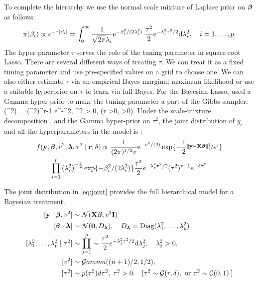 \documentclass[chapters]{uamaththesis}
\begin{document}
To complete the hierarchy we use the normal scale mixture of Laplace prior on $\boldsymbol{\beta}$  as follows:
\[
\pi(\beta_i) \propto e^{-\tau \lvert\beta_i\rvert} = \int_{0}^{\infty} \frac{1}{\sqrt{2\pi} \lambda_i} {\rm e}^{-\beta_i^2/(2\lambda_i^2)} \; \frac{\tau^2}{2} {\rm e}^{-\lambda_i^2\tau^2/2} {\rm d} \lambda_i^2, \quad i = 1, \ldots, p.
\]
The hyper-parameter $\tau$ serves the role of the tuning parameter in square-root Lasso. There are several different ways of treating $\tau$. We can treat it as a fixed tuning parameter and use pre-specified values on a grid to choose one.  We can also either estimate $\tau$ via an empirical Bayes marginal maximum likelihood or use a suitable hyperprior on $\tau$ to learn via full Bayes. For the Bayesian Lasso, \cite{park_bayesian_2008} used a Gamma hyper-prior to make the tuning parameter a part of the Gibbs sampler. 
\beq
\pi(\tau^2) =  (\tau^2)^{r-1} e^{-\delta \tau^2}, \; \tau^2 > 0, \; (r >0, \delta >0).
\eeq
Under the scale-mixture decomposition \label{eq:v_i}, and the Gamma hyper-prior on $\tau^2$, the joint distribution of $y_i$ and all the hyperparameters in the model is :
\begin{multline}
f({\bf y}, \boldsymbol{\beta}, v^2, \boldsymbol{\lambda}, \tau^2 \mid {\bf r}, \delta) \propto 
\frac{1}{(2 \pi)^{1/2} v} {\rm e}^{-{v^2}/({2})} \exp\{- \frac{1}{2} \nicefrac{\lVert{\bf y} - {\bf X} \boldsymbol{\beta}\rVert_2^2 }{v^2}\} \\
\prod_{i=1}^{p} {(\lambda_i^2)}^{-\frac{1}{2}} \exp\{-\beta_i^2/(2\lambda_i^2)\} \frac{\tau^2}{2} e^{-\lambda_i^2\tau^2/2} (\tau^2)^{r-1} e^{-\delta \tau^2} \label{eq:joint}
\end{multline}

The joint distribution in \eqref{eq:joint} provides the full hierarchical model for a Bayesian treatment. 
\begin{align}\label{sq_lasso_h}
[\y \mid \bbeta, v^2] & \sim \NormRV(\X \bbeta, v^2 \I) \\
[\bbeta \mid \blambda] & \sim \NormRV(\0, D_{\blambda}), \quad D_{\blambda} = \text{Diag}(\lambda_1^2, \ldots, \lambda_p^2) \\
[\lambda_1^2, \ldots, \lambda_p^2 \mid \tau^2] & \sim \prod_{j=1}^{p} \sim \frac{\tau^2}{2} e^{-\lambda_j^2\tau^2/2} \d \lambda_j^2, \quad \lambda_j^2 > 0, \\
[v^2] & \sim \mathcal{G}amma((n+1)/2 , 1/2),  \\
[\tau^2] & \sim p(\tau^2) d\tau^2,  \; \tau^2 > 0. \quad [ \tau^2 \sim \GammaRV(r, \delta), \text{ or } \tau^2 \sim \CauchyRV(0,1). ]
\end{align}
\end{document}

